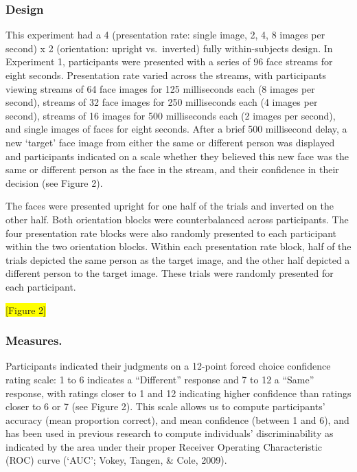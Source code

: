 \documentclass[
  english,
  man]{apa6}
\begin{document}
\hypertarget{design}{%
\subsubsection{Design}\label{design}}

This experiment had a 4 (presentation rate: single image, 2, 4, 8 images per second) x 2 (orientation: upright vs.~inverted) fully within-subjects design. In Experiment 1, participants were presented with a series of 96 face streams for eight seconds. Presentation rate varied across the streams, with participants viewing streams of 64 face images for 125 milliseconds each (8 images per second), streams of 32 face images for 250 milliseconds each (4 images per second), streams of 16 images for 500 milliseconds each (2 images per second), and single images of faces for eight seconds. After a brief 500 millisecond delay, a new `target' face image from either the same or different person was displayed and participants indicated on a scale whether they believed this new face was the same or different person as the face in the stream, and their confidence in their decision (see Figure 2).

The faces were presented upright for one half of the trials and inverted on the other half. Both orientation blocks were counterbalanced across participants. The four presentation rate blocks were also randomly presented to each participant within the two orientation blocks. Within each presentation rate block, half of the trials depicted the same person as the target image, and the other half depicted a different person to the target image. These trials were randomly presented for each participant.

\colorbox{yellow}{[Figure 2]}

\hypertarget{measures.}{%
\subsubsection{Measures.}\label{measures.}}

Participants indicated their judgments on a 12-point forced choice confidence rating scale: 1 to 6 indicates a ``Different'' response and 7 to 12 a ``Same'' response, with ratings closer to 1 and 12 indicating higher confidence than ratings closer to 6 or 7 (see Figure 2). This scale allows us to compute participants' accuracy (mean proportion correct), and mean confidence (between 1 and 6), and has been used in previous research to compute individuals' discriminability as indicated by the area under their proper Receiver Operating Characteristic (ROC) curve (`AUC'; Vokey, Tangen, \& Cole, 2009).
\end{document}

